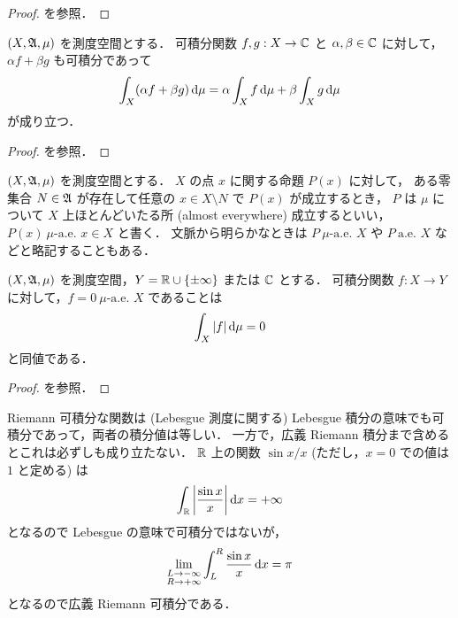 \begin{proof}
    \cite[定理 12.1]{It63} を参照．
\end{proof}

\begin{theorem}
    $(X,\mathfrak{A},\mu)$ を測度空間とする．
    可積分関数 $f,g:X\to\mathbb{C}$ と $\alpha,\beta\in\mathbb{C}$ に対して，
    $\alpha f+\beta g$ も可積分であって
    \begin{align*}
        \int_X(\alpha f+\beta g)\,\mathrm{d}\mu
        =\alpha\int_Xf\,\mathrm{d}\mu+\beta\int_Xg\,\mathrm{d}\mu
    \end{align*}
    が成り立つ．
\end{theorem}

\begin{proof}
    \cite[定理 12.3, 系 1]{It63} を参照．
\end{proof}

\begin{definition}
    $(X,\mathfrak{A},\mu)$ を測度空間とする．
    $X$ の点 $x$ に関する命題 $P(x)$ に対して，
    ある零集合 $N\in\mathfrak{A}$ が存在して任意の $x\in X\setminus N$ で $P(x)$ が成立するとき，
    $P$ は $\mu$ について $X$ 上ほとんどいたる所 (almost everywhere) 成立するといい，
    $P(x)\ \textrm{$\mu$-a.e.\ $x\in X$}$ と書く．
    文脈から明らかなときは $P\ \textrm{$\mu$-a.e.\ $X$}$ や $P\ \textrm{a.e.\ $X$}$ などと略記することもある．
\end{definition}

\begin{theorem}
    $(X,\mathfrak{A},\mu)$ を測度空間，$Y=\mathbb{R}\cup\{\pm\infty\} $ または $\mathbb{C}$ とする．
    可積分関数 $f:X\to Y$ に対して，$f=0\ \textrm{$\mu$-a.e.\ $X$}$ であることは
    \begin{align*}
        \int_X|f|\,\mathrm{d}\mu=0
    \end{align*}
    と同値である．
\end{theorem}

\begin{proof}
    \cite[定理 12.3, 系 2]{It63} を参照．
\end{proof}

\begin{example}
    Riemann 可積分な関数は (Lebesgue 測度に関する) Lebesgue 積分の意味でも可積分であって，両者の積分値は等しい．
    一方で，広義 Riemann 積分まで含めるとこれは必ずしも成り立たない．
    $\mathbb{R}$ 上の関数 $\sin x/x$ (ただし，$x=0$ での値は $1$ と定める) は
    \begin{align*}
        \int_{\mathbb{R}}\left\lvert\frac{\sin x}{x}\right\rvert\mathrm{d} x=+\infty
    \end{align*}
    となるので Lebesgue の意味で可積分ではないが，
    \begin{align*}
        \lim_{\substack{L\to-\infty\\R\to+\infty}}\int_{L}^R\frac{\sin x}{x}\,\mathrm{d} x=\pi
    \end{align*}
    となるので広義 Riemann 可積分である．
\end{example}
